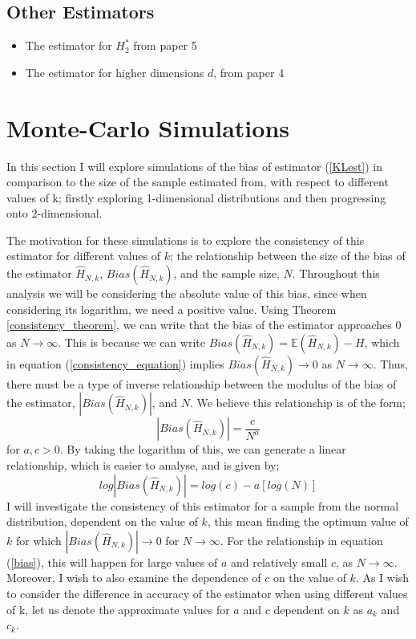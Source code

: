 \documentclass{article}
\begin{document}
\subsection{Other Estimators}
\begin{itemize}
\item The estimator for $H_{2}^{*}$ from paper 5
\item The estimator for higher dimensions $d$, from paper 4
\end{itemize}



\section{Monte-Carlo Simulations}

In this section I will explore simulations of the bias of estimator (\ref{KLest}) in comparison to the size of the sample estimated from, with respect to different values of k; firstly exploring 1-dimensional distributions and then progressing onto 2-dimensional.

The motivation for these simulations is to explore the consistency of this estimator for different values of $k$; the relationship between the size of the bias of the estimator $\hat{H}_{N, k}$, $Bias(\hat{H}_{N, k})$,  and the sample size, $N$. Throughout this analysis we will be considering the absolute value of this bias, since when considering its logarithm, we need a positive value. Using Theorem \ref{consistency_theorem}, we can write that the bias of the estimator approaches 0 as $N \to \infty$. This is because we can write $Bias(\hat{H}_{N, k} ) = \mathbb{E}(\hat{H}_{N, k}) - H$, which in equation (\ref{consistency_equation}) implies $Bias(\hat{H}_{N, k}) \to 0$ as $N \to \infty$. Thus, there must be a type of inverse relationship between the modulus of the bias of the estimator, $|Bias(\hat{H}_{N, k})|$, and $N$. We believe this relationship is of the form;
\begin{equation} \label{bias}
|Bias(\hat{H}_{N, k})| = \frac{c}{N^a}
\end{equation}
for $a, c > 0$. By taking the logarithm of this, we can generate a linear relationship, which is easier to analyse, and is given by;
\begin{equation} \label{logbias}
log|Bias(\hat{H}_{N, k})| = log(c) - a [log(N)]
\end{equation}
I will investigate the consistency of this estimator for a sample from the normal distribution, dependent on the value of $k$, this mean finding the optimum value of $k$ for which $|Bias(\hat{H}_{N, k})| \to 0$ for $N \to \infty$. For the relationship in equation (\ref{bias}), this will happen for large values of $a$ and relatively small $c$, as $N \to \infty$. Moreover, I wish to also examine the dependence of $c$ on the value of $k$. As I wish to consider the difference in accuracy of the estimator when using different values of k, let us denote the approximate values for $a$ and $c$ dependent on $k$ as $a_{k}$ and $c_{k}$.
\end{document}
